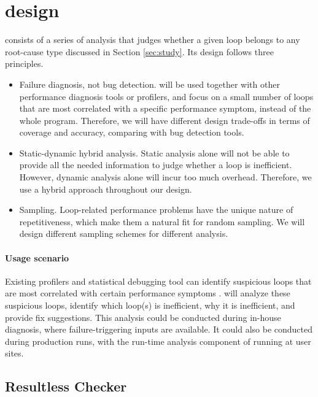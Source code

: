 \section{\Tool design}
\label{sec:design}
\Tool consists of a series of analysis that
judges whether a given loop belongs to any root-cause type discussed in
Section \ref{sec:study}.
Its design
follows three principles.
\begin{itemize}
\item Failure diagnosis, not bug detection. \Tool will be  
used together with other performance diagnosis tools \cite{SongOOPSLA2014}
or profilers,
and focus on a small
number of loops that are most correlated with a specific performance symptom,
instead of the whole program. Therefore, we will have different
design trade-offs in terms of coverage and accuracy, comparing with 
bug detection tools.

\item Static-dynamic hybrid analysis. Static analysis alone
will not be able to provide all the needed information to judge whether
a loop is inefficient. However, 
dynamic analysis alone will incur too much overhead.
Therefore, we use a hybrid approach throughout our design.

\item Sampling. Loop-related 
performance problems have the unique nature of repetitiveness, which make 
them a natural fit for random sampling. We will design different
sampling schemes for different analysis.
\end{itemize}

\paragraph{Usage scenario}
Existing profilers and statistical debugging tool can
identify suspicious loops that are most correlated with 
certain performance 
symptoms \cite{SongOOPSLA2014}. 
\Tool will analyze
these suspicious loops, identify which loop(s) is inefficient, why it is
inefficient, and provide fix suggestions. This analysis could be
conducted during in-house diagnosis, where failure-triggering inputs
are available. It could also be conducted during production runs, with
the run-time analysis component of \Tool running 
at user sites.



\subsection{Resultless Checker}
\label{sec:workless}

